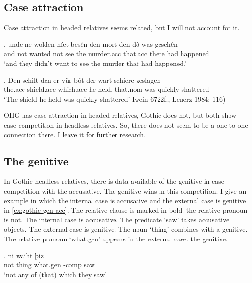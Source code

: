 \subsection{Case attraction}\label{sec:attraction}

Case attraction in headed relatives seems related, but I will not account for it.

\exg. unde ne wolden níet besên den mort den dô was geschên\\
 and not wanted not see the murder.\ac{acc} that.\ac{acc} there had happened\\
 `and they didn't want to see the murder that had happened.' 

 \exg. Den schilt den er {vür bôt} der wart schiere zeslagen\\
 the.\ac{acc} shield.\ac{acc} which.\ac{acc} he held, that.\ac{nom} was quickly shattered\\
 `The shield he held was quickly shattered' \label{ex:iaheaded}\hfill Iwein 6722f., Lenerz 1984: 116)

OHG has case attraction in headed relatives, Gothic does not, but both show case competition in headless relatives. So, there does not seem to be a one-to-one connection there. I leave it for further research.

\subsection{The genitive}\label{sec:genitive}

In Gothic headless relatives, there is data available of the genitive in case competition with the accusative. The genitive wins in this competition.
I give an example in which the internal case is accusative and the external case is genitive in \ref{ex:gothic-gen-acc}.
The relative clause is marked in bold, the relative pronoun is not.
The internal case is accusative. The predicate  `saw' takes accusative objects.
The external case is genitive. The noun  `thing' combines with a genitive.
The relative pronoun  `what.\ac{gen}' appears in the external case: the genitive.

\exg. ni waiht þiz  \\
 not thing\scsub{[gen]} what.\ac{gen} -\ac{comp} saw\scsub{[acc]}\\
 `not any of (that) which they saw' \label{ex:gothic-gen-acc}

